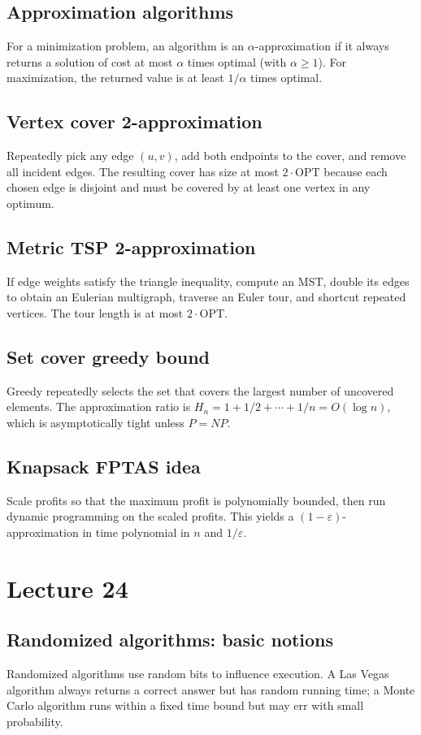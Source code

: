 \documentclass[11pt]{article}
\begin{document}
{{{{\subsection*{Approximation algorithms}
For a minimization problem, an algorithm is an $\alpha$-approximation if it always returns a
solution of cost at most $\alpha$ times optimal (with $\alpha \ge 1$). For maximization, the
returned value is at least $1/\alpha$ times optimal.

\subsection*{Vertex cover 2-approximation}
Repeatedly pick any edge $(u,v)$, add both endpoints to the cover, and remove all incident edges.
The resulting cover has size at most $2 \cdot \text{OPT}$ because each chosen edge is disjoint and
must be covered by at least one vertex in any optimum.

\subsection*{Metric TSP 2-approximation}
If edge weights satisfy the triangle inequality, compute an MST, double its edges to obtain an
Eulerian multigraph, traverse an Euler tour, and shortcut repeated vertices. The tour length is
at most $2 \cdot \text{OPT}$.

\subsection*{Set cover greedy bound}
Greedy repeatedly selects the set that covers the largest number of uncovered elements. The
approximation ratio is $H_n = 1 + 1/2 + \cdots + 1/n = O(\log n)$, which is asymptotically tight
unless $P=NP$.

\subsection*{Knapsack FPTAS idea}
Scale profits so that the maximum profit is polynomially bounded, then run dynamic programming on
the scaled profits. This yields a $(1-\varepsilon)$-approximation in time polynomial in $n$ and
$1/\varepsilon$.

\section{Lecture 24}

\subsection*{Randomized algorithms: basic notions}
Randomized algorithms use random bits to influence execution. A Las Vegas algorithm always
returns a correct answer but has random running time; a Monte Carlo algorithm runs within a
fixed time bound but may err with small probability.

}}}}
\end{document}
